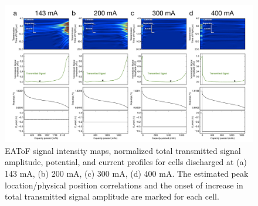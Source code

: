 \begin{figure}[htb]
  \centering
    \includegraphics[width=1.00\textwidth]{ch5-alkbw/images/Fig1_v2.png}
    \caption[EAToF results for alkaline AA cells discharged at multiple rates.]{EAToF signal intensity maps, normalized total transmitted signal amplitude, potential, and current profiles for cells discharged at (a) 143 mA, (b) 200 mA, (c) 300 mA, (d) 400 mA. The estimated peak location/physical position correlations and the onset of increase in total transmitted signal amplitude are marked for each cell.}
    \label{fig:alkbwrates}
\end{figure}

